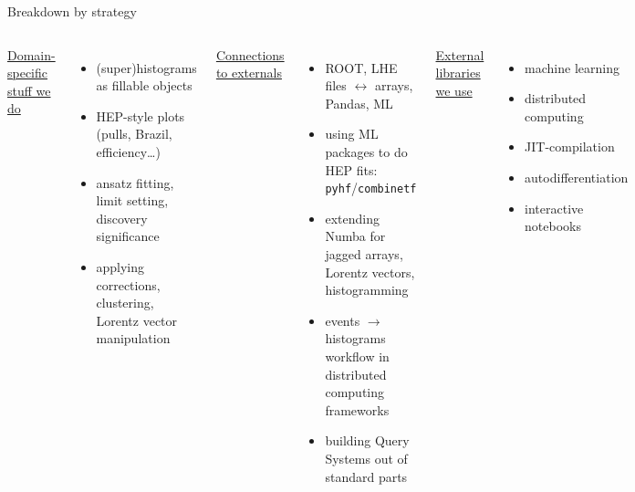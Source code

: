 \documentclass[aspectratio=169]{beamer}
\begin{document}
\begin{frame}{Breakdown by strategy}
\vspace{0.3 cm}
\begin{columns}[t]
\underline{\large Domain-specific stuff we do}

\vspace{0.15 cm}
\begin{itemize}
\item (super)histograms as fillable objects
\item HEP-style plots (pulls, Brazil, efficiency\ldots)
\item ansatz fitting, limit setting, discovery significance
\item applying corrections, clustering, Lorentz vector manipulation
\end{itemize}

\underline{\large Connections to externals}

\vspace{0.15 cm}
\begin{itemize}
\item ROOT, LHE files $\leftrightarrow$ arrays, Pandas, ML
\item using ML packages to do HEP fits: \texttt{pyhf}/\texttt{combinetf}
\item extending Numba for jagged arrays, Lorentz vectors, histogramming
\item events $\to$ histograms workflow in distributed computing frameworks
\item building Query Systems out of standard parts
\end{itemize}

\underline{\large External libraries we use}

\vspace{0.15 cm}
\begin{itemize}
\item machine learning
\item distributed computing
\item JIT-compilation
\item autodifferentiation
\item interactive notebooks
\end{itemize}

\end{columns}
\end{frame}
\end{document}
